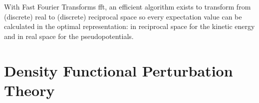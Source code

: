 \documentclass[main.tex]{subfiles}
\begin{document}
With Fast Fourier Transforms \gls{fft}, an efficient algorithm exists to transform from (discrete) real to (discrete) reciprocal space so every expectation value can be calculated in the optimal representation: in reciprocal space for the kinetic energy and in real space for the pseudopotentials.

\section{Density Functional Perturbation Theory}\label{sec:theory_dfpt}

\end{document}
